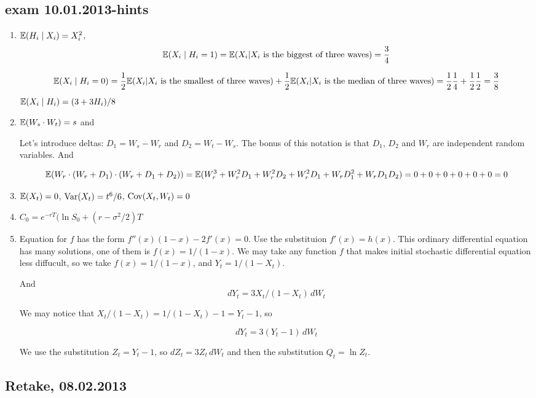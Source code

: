 \documentclass[12pt, a4paper]{article}
\begin{document}
\subsection{exam 10.01.2013-hints}
\begin{enumerate}
\item $\mathbb{E}(H_i \mid X_i)=X_i^2$,
\[
\mathbb{E}(X_i \mid H_i=1)= \mathbb{E}(X_i|X_i \text{ is the biggest of three waves}) = \frac{3}{4}
\]

\[
\mathbb{E}(X_i \mid H_i=0)=\frac{1}{2}\mathbb{E}(X_i|X_i \text{ is the smallest of three waves}) + \frac{1}{2}\mathbb{E}(X_i|X_i \text{ is the median of three waves}) = \frac{1}{2}\frac{1}{4} + \frac{1}{2}\frac{1}{2}=\frac{3}{8}
\]
$\mathbb{E}(X_i \mid H_i)= (3+3H_i)/8$
\item $\mathbb{E}(W_s \cdot W_t)=s$ and

Let's introduce deltas: $D_1 = W_s - W_r$ and $D_2 = W_t - W_s$. The bonus of this notation is that $D_1$, $D_2$ and $W_r$ are independent random variables. And

\[
\mathbb{E}(W_r \cdot (W_r + D_1) \cdot (W_r + D_1 + D_2))=\mathbb{E}(W_r^3 + W_r^2 D_1 + W_r^2 D_2 + W_r^2 D_1 + W_r D_1^2 + W_r D_1 D_2) = 0 + 0 + 0 + 0 + 0 + 0 = 0
\]



\item $\mathbb{E}(X_t)=0$, $\operatorname{Var}(X_t)=t^6/6$, $\operatorname{Cov}(X_t,W_t)=0$
\item $C_0=e^{-rT}(\ln S_0+(r-\sigma^2/2)T$
\item Equation for $f$ has the form $f''(x)(1-x)-2f'(x)=0$. Use the substituion $f'(x)=h(x)$. This ordinary differential equation has many solutions, one of them is $f(x)=1/(1-x)$.   We may take any function $f$ that makes initial stochastic differential equation less diffucult, so we take $f(x)=1/(1-x)$, and  $Y_t=1/(1-X_t)$.

And
\[
dY_t = 3X_t / (1-X_t) \, dW_t
\]

We may notice that $X_t/(1-X_t)=1/(1-X_t)-1=Y_t-1$, so

\[
dY_t= 3(Y_t-1) \, dW_t
\]

We use the substitution $Z_t=Y_t-1$, so $dZ_t=3Z_t \, dW_t$ and then the substitution $Q_t = \ln Z_t$.


\end{enumerate}




\subsection{Retake, 08.02.2013}
\end{document}
